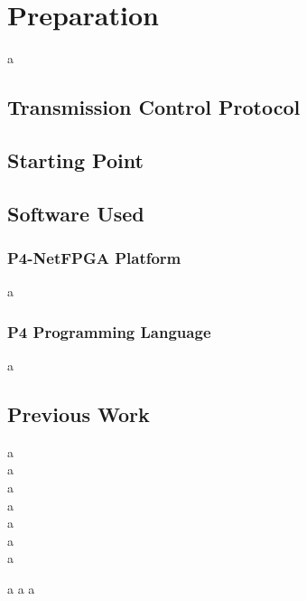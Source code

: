 \chapter{Preparation}
a
\section{Transmission Control Protocol}

\section{Starting Point}

\section{Software Used}

\subsection{P4-NetFPGA Platform}
a
\subsection{P4 Programming Language}
a
\section{Previous Work}
a \\
a\\
a\\
a\\
a\\
a\\
a

a
a
a
